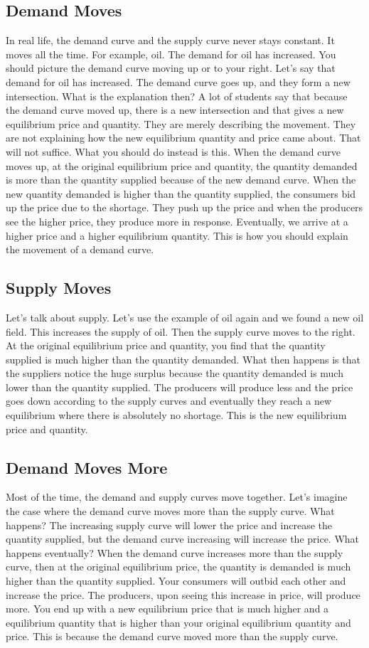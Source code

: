 \subsection{Demand Moves}
In real life, the demand curve and the supply curve never stays constant. It moves all the time. For example, oil. The demand for oil has increased. You should picture the demand curve moving up or to your right. Let's say that demand for oil has increased. The demand curve goes up, and they form a new intersection. What is the explanation then? A lot of students say that because the demand curve moved up, there is a new intersection and that gives a new equilibrium price and quantity. They are merely describing the movement. They are not explaining how the new equilibrium quantity and price came about. That will not suffice. What you should do instead is this. When the demand curve moves up, at the original equilibrium price and quantity, the quantity demanded is more than the quantity supplied because of the new demand curve. When the new quantity demanded is higher than the quantity supplied, the consumers bid up the price due to the shortage. They push up the price and when the producers see the higher price, they produce more in response. Eventually, we arrive at a higher price and a higher equilibrium quantity. This is how you should explain the movement of a demand curve.
\subsection{Supply Moves}
Let's talk about supply. Let's use the example of oil again and we found a new oil field. This increases the supply of oil. Then the supply curve moves to the right. At the original equilibrium price and quantity, you find that the quantity supplied is much higher than the quantity demanded. What then happens is that the suppliers notice the huge surplus because the quantity demanded is much lower than the quantity supplied. The producers will produce less and the price goes down according to the supply curves and eventually they reach a new equilibrium where there is absolutely no shortage. This is the new equilibrium price and quantity.
\subsection{Demand Moves More}
Most of the time, the demand and supply curves move together. Let's imagine the case where the demand curve moves more than the supply curve. What happens? The increasing supply curve will lower the price and increase the quantity supplied, but the demand curve increasing will increase the price. What happens eventually? When the demand curve increases more than the supply curve, then at the original equilibrium price, the quantity is demanded is much higher than the quantity supplied. Your consumers will outbid each other and increase the price. The producers, upon seeing this increase in price, will produce more. You end up with a new equilibrium price that is much higher and a equilibrium quantity that is higher than your original equilibrium quantity and price. This is because the demand curve moved more than the supply curve.
